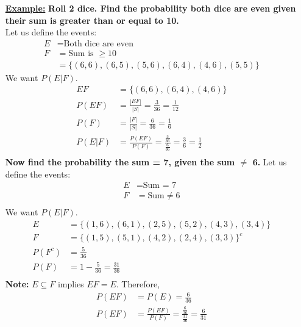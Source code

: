\documentclass[10pt]{article}
\begin{document}
\begin{itemize}
    \item[\textbf{\underline{Example:}}] \textbf{Roll 2 dice. Find the
        probability both dice are even given their sum is greater than or equal
    to 10.} \\
    Let us define the events:
        $$ \begin{aligned}
            E &= \text{Both dice are even}\\
            F &= \text{Sum is } \geq 10 \\
              &= \{ (6,6), (6,5), (5,6), (6,4), (4,6), (5,5) \}
        \end{aligned} $$
        We want $P(E | F)$.
        $$ \begin{aligned}
            EF &= \{(6,6), (6,4), (4,6)\}\\
            P(EF) &=  \frac{|EF|}{|S|} = \frac{3}{36} = \frac{1}{12} \\
            P(F) &=  \frac{|F|}{|S|} = \frac{6}{36} = \frac{1}{6} \\
            P(E|F) &=  \frac{P(EF)}{P(F)} = \frac{\frac{3}{36}}{\frac{6}{36}} =
            \frac{3}{6} = \frac{1}{2} \\
        \end{aligned} $$
        \textbf{Now find the probability the sum = 7, given the sum $\neq$ 6.}
    Let us define the events:
        $$ \begin{aligned}
            E &= \text{Sum = 7}\\
            F &= \text{Sum} \neq 6 \\
        \end{aligned} $$
        We want $P(E | F)$.
        $$ \begin{aligned}
            E &= \{(1,6), (6,1), (2,5), (5,2), (4,3), (3,4)\}\\
            F &= \{(1,5), (5,1), (4,2), (2,4), (3,3)\}^c \\
            P(F^c) &= \frac{5}{36} \\
            P(F)   &= 1 - \frac{5}{36} = \frac{31}{36} \\
        \end{aligned} $$
        \textbf{Note:} $E \subseteq F$ implies $EF = E$. Therefore,
        $$ \begin{aligned}
            P(EF) &= P(E) = \frac{6}{36} \\
            P(EF) &= \frac{P(EF)}{P(F)} = \frac{\frac{6}{36}}{\frac{31}{36}} =
            \frac{6}{31} \\
        \end{aligned} $$
\end{itemize}
\end{document}
